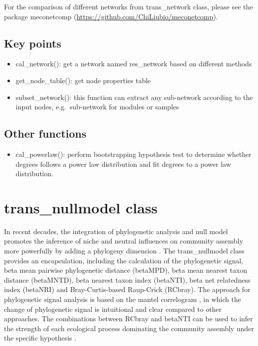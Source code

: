 \documentclass[
]{book}
\providecommand{\tightlist}{%
  \setlength{\itemsep}{0pt}\setlength{\parskip}{0pt}}
\begin{document}
For the comparison of different networks from trans\_network class,
please see the package meconetcomp (\url{https://github.com/ChiLiubio/meconetcomp}).

\hypertarget{key-points-6}{%
\subsection{Key points}\label{key-points-6}}

\begin{itemize}
\tightlist
\item
  cal\_network(): get a network named res\_network based on different methods
\item
  get\_node\_table(): get node properties table
\item
  subset\_network(): this function can extract any sub-network according to the input nodes, e.g.~sub-network for modules or samples
\end{itemize}

\hypertarget{other-functions}{%
\subsection{Other functions}\label{other-functions}}

\begin{itemize}
\tightlist
\item
  cal\_powerlaw(): perform bootstrapping hypothesis test to determine whether degrees follows a power law distribution and fit degrees to a power law distribution.
\end{itemize}

\hypertarget{trans_nullmodel-class}{%
\section{trans\_nullmodel class}\label{trans_nullmodel-class}}

In recent decades,
the integration of phylogenetic analysis and null model promotes the inference of niche and neutral influences on community assembly more powerfully
by adding a phylogeny dimension \citep{Webb_Phylogenies_2002, Picante_Kembel_2010, Stegen_Quantifying_2013}.
The trans\_nullmodel class provides an encapsulation, including the calculation of the phylogenetic signal,
beta mean pairwise phylogenetic distance (betaMPD), beta mean nearest taxon distance (betaMNTD),
beta nearest taxon index (betaNTI), beta net relatedness index (betaNRI) and Bray-Curtis-based Raup-Crick (RCbray).
The approach for phylogenetic signal analysis is based on the mantel correlogram \citep{Liu_Long_term_2017},
in which the change of phylogenetic signal is intuitional and clear compared to other approaches.
The combinations between RCbray and betaNTI can be used to infer the strength of each ecological process dominating the community assembly
under the specific hypothesis \citep{Stegen_Quantifying_2013}.
\end{document}
